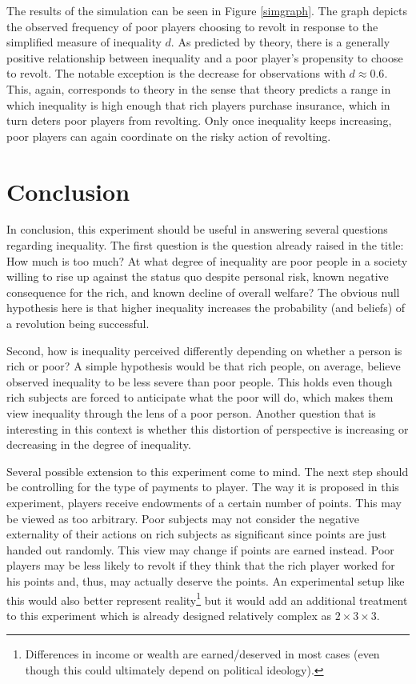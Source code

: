 \documentclass[12pt]{article}
\begin{document}
	The results of the simulation can be seen in Figure \ref{simgraph}. The 
	graph depicts the observed frequency of poor players choosing to revolt in 
	response to the simplified measure of inequality $d$. As predicted by 
	theory, there is a generally positive relationship between inequality and a 
	poor player's propensity to choose to revolt. The notable exception is the 
	decrease for observations with $d\approx0.6$. This, again, corresponds to 
	theory in the sense that theory predicts a range in which inequality is 
	high enough that rich players purchase insurance, which in turn deters poor 
	players from revolting. Only once inequality keeps increasing, poor players 
	can again coordinate on the risky action of revolting.
	
	
	\section{Conclusion}
	In conclusion, this experiment should be useful in answering several 
	questions regarding inequality. The first question is the question already 
	raised in the title: How much is too much? At what degree of inequality are 
	poor people in a society willing to rise up against the status quo despite 
	personal risk, known negative consequence for the rich, and known decline 
	of overall welfare? The obvious null hypothesis here is that higher 
	inequality increases the probability (and beliefs) of a revolution being 
	successful.
	
	Second, how is inequality perceived differently depending on whether a 
	person is rich or poor? A simple hypothesis would be that rich people, on 
	average, believe observed inequality to be less severe than poor people. 
	This holds even though rich subjects are forced to anticipate what the 
	poor will do, which makes them view inequality through the lens of a poor 
	person. Another question that is interesting in this context is whether 
	this distortion of perspective is increasing or decreasing in the degree of 
	inequality.
	
	Several possible extension to this experiment come to mind. The next step 
	should be controlling for the type of payments to player. The way it is 
	proposed in this experiment, players receive endowments of a certain number 
	of points. This may be viewed as too arbitrary. Poor subjects may not 
	consider the negative externality of their actions on rich subjects as 
	significant since points are just handed out randomly. This view may change 
	if points are earned instead. Poor players may be less likely to revolt if 
	they think that the rich player worked for his points and, thus, may 
	actually 
	deserve the points. An experimental setup like this would also better 
	represent reality\footnote{Differences in income or wealth are 
	earned/deserved in most cases (even though this could ultimately depend on 
	political ideology).} but it would add an additional treatment to this 
	experiment which is already designed relatively complex as 
	$2\times3\times3$.
	
\end{document}
